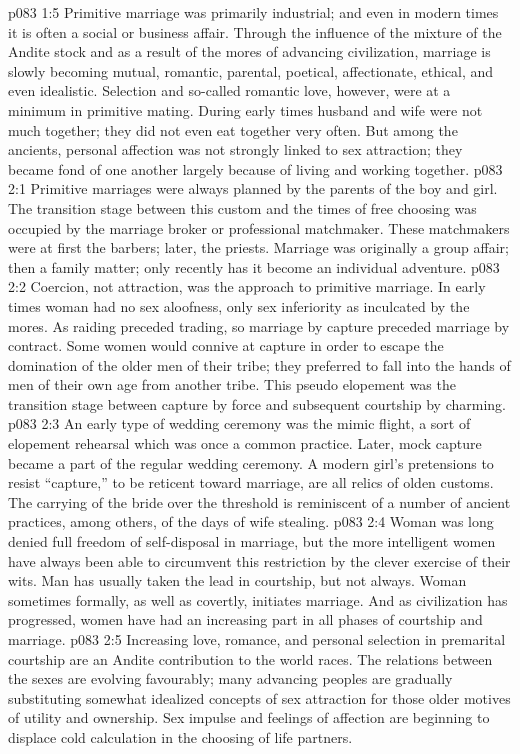 \vs p083 1:5 Primitive marriage was primarily industrial; and even in modern times it is often a social or business affair. Through the influence of the mixture of the Andite stock and as a result of the mores of advancing civilization, marriage is slowly becoming mutual, romantic, parental, poetical, affectionate, ethical, and even idealistic. Selection and so\hyp{}called romantic love, however, were at a minimum in primitive mating. During early times husband and wife were not much together; they did not even eat together very often. But among the ancients, personal affection was not strongly linked to sex attraction; they became fond of one another largely because of living and working together.
\vs p083 2:1 Primitive marriages were always planned by the parents of the boy and girl. The transition stage between this custom and the times of free choosing was occupied by the marriage broker or professional matchmaker. These matchmakers were at first the barbers; later, the priests. Marriage was originally a group affair; then a family matter; only recently has it become an individual adventure.
\vs p083 2:2 Coercion, not attraction, was the approach to primitive marriage. In early times woman had no sex aloofness, only sex inferiority as inculcated by the mores. As raiding preceded trading, so marriage by capture preceded marriage by contract. Some women would connive at capture in order to escape the domination of the older men of their tribe; they preferred to fall into the hands of men of their own age from another tribe. This pseudo elopement was the transition stage between capture by force and subsequent courtship by charming.
\vs p083 2:3 An early type of wedding ceremony was the mimic flight, a sort of elopement rehearsal which was once a common practice. Later, mock capture became a part of the regular wedding ceremony. A modern girl’s pretensions to resist “capture,” to be reticent toward marriage, are all relics of olden customs. The carrying of the bride over the threshold is reminiscent of a number of ancient practices, among others, of the days of wife stealing.
\vs p083 2:4 Woman was long denied full freedom of self\hyp{}disposal in marriage, but the more intelligent women have always been able to circumvent this restriction by the clever exercise of their wits. Man has usually taken the lead in courtship, but not always. Woman sometimes formally, as well as covertly, initiates marriage. And as civilization has progressed, women have had an increasing part in all phases of courtship and marriage.
\vs p083 2:5 Increasing love, romance, and personal selection in premarital courtship are an Andite contribution to the world races. The relations between the sexes are evolving favourably; many advancing peoples are gradually substituting somewhat idealized concepts of sex attraction for those older motives of utility and ownership. Sex impulse and feelings of affection are beginning to displace cold calculation in the choosing of life partners.
